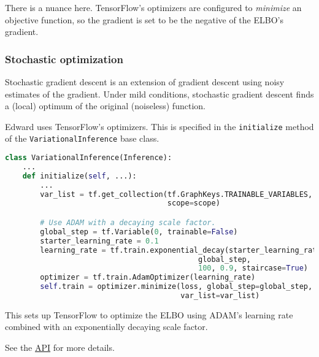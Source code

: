There is a nuance here. TensorFlow's optimizers are configured to
\emph{minimize} an objective function, so the gradient is set to be
the negative of the ELBO's gradient.

\subsubsection{Stochastic optimization}

Stochastic gradient descent is an extension of gradient descent using
noisy estimates of the gradient. Under mild conditions, stochastic
gradient descent finds a (local) optimum of the original (noiseless)
function.

Edward uses TensorFlow's optimizers.
This is specified in the \texttt{initialize} method of the
\texttt{VariationalInference} base class.

\begin{lstlisting}[language=Python]
class VariationalInference(Inference):
    ...
    def initialize(self, ...):
        ...
        var_list = tf.get_collection(tf.GraphKeys.TRAINABLE_VARIABLES,
                                     scope=scope)

        # Use ADAM with a decaying scale factor.
        global_step = tf.Variable(0, trainable=False)
        starter_learning_rate = 0.1
        learning_rate = tf.train.exponential_decay(starter_learning_rate,
                                            global_step,
                                            100, 0.9, staircase=True)
        optimizer = tf.train.AdamOptimizer(learning_rate)
        self.train = optimizer.minimize(loss, global_step=global_step,
                                        var_list=var_list)
\end{lstlisting}

This sets up TensorFlow to optimize the ELBO using ADAM's learning
rate combined with an exponentially decaying scale factor.

See the \href{api/index.html}{API} for more details.
